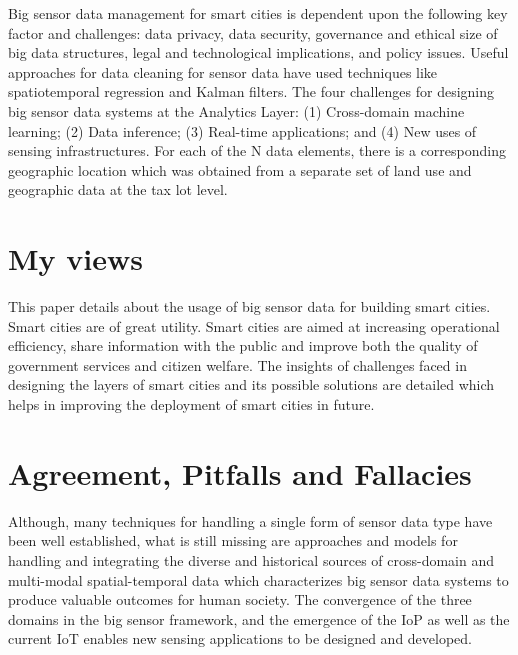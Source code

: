 \documentclass{report}
\begin{document}
\begin{multicols}{1}
Big sensor data management for smart cities is dependent upon the following key factor and challenges: data privacy, data security, governance and ethical size of big data structures, legal and technological implications, and policy issues. Useful approaches for data cleaning for sensor data have used techniques like spatiotemporal regression and Kalman filters. The four challenges for designing big sensor data systems at the Analytics Layer: (1) Cross-domain machine learning; (2) Data inference; (3) Real-time applications; and (4) New uses of sensing infrastructures. For each of the N data elements, there is a corresponding geographic location which was obtained from a separate set of land use and geographic data at the tax lot level.\\

    

    \section*{My views}
   
    This paper details about the usage of big sensor data for building smart cities. Smart cities are of great utility. Smart cities are aimed at increasing operational efficiency, share information with the public and improve both the quality of government services and citizen welfare. The insights of challenges faced in designing the layers of smart cities and its possible solutions are detailed which helps in improving the deployment of smart cities in future.
    
    
    \section*{Agreement, Pitfalls and Fallacies}
    Although, many techniques for handling a single form of sensor data type have been well established, what is still missing are approaches and models for handling and integrating the diverse and historical sources of cross-domain and multi-modal spatial-temporal data which characterizes big sensor data systems to produce valuable outcomes for human society. The convergence of the three domains in the big sensor framework, and the emergence of the IoP as well as the current IoT enables new sensing applications to be designed and developed.
    
    
\end{multicols}
\end{document}
